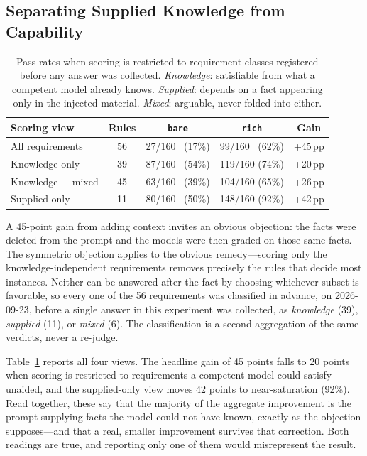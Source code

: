 \documentclass[conference]{IEEEtran}
\begin{document}
\subsection{Separating Supplied Knowledge from Capability}\label{sec:knowledge-split}

\begin{table}[t]
\centering
\caption{Pass rates when scoring is restricted to requirement classes registered before any answer was collected. \emph{Knowledge}: satisfiable from what a competent model already knows. \emph{Supplied}: depends on a fact appearing only in the injected material. \emph{Mixed}: arguable, never folded into either.}
\label{tab:knowledge-split}
\setlength{\tabcolsep}{5pt}
\begin{tabular}{lcccc}
\toprule
Scoring view & Rules & \texttt{bare} & \texttt{rich} & Gain \\
\midrule
All requirements   & 56 & 27/160 \ (17\%) & 99/160 \ (62\%) & +45\,pp \\
Knowledge only     & 39 & 87/160 \ (54\%) & 119/160 (74\%) & +20\,pp \\
Knowledge + mixed  & 45 & 63/160 \ (39\%) & 104/160 (65\%) & +26\,pp \\
Supplied only      & 11 & 80/160 \ (50\%) & 148/160 (92\%) & +42\,pp \\
\bottomrule
\end{tabular}
\end{table}

A 45-point gain from adding context invites an obvious objection: the facts were deleted from the prompt and the models were then graded on those same facts. The symmetric objection applies to the obvious remedy---scoring only the knowledge-independent requirements removes precisely the rules that decide most instances. Neither can be answered after the fact by choosing whichever subset is favorable, so every one of the 56 requirements was classified in advance, on 2026-09-23, before a single answer in this experiment was collected, as \emph{knowledge} (39), \emph{supplied} (11), or \emph{mixed} (6). The classification is a second aggregation of the same verdicts, never a re-judge.

Table~\ref{tab:knowledge-split} reports all four views. The headline gain of 45 points falls to 20 points when scoring is restricted to requirements a competent model could satisfy unaided, and the supplied-only view moves 42 points to near-saturation (92\%). Read together, these say that the majority of the aggregate improvement is the prompt supplying facts the model could not have known, exactly as the objection supposes---and that a real, smaller improvement survives that correction. Both readings are true, and reporting only one of them would misrepresent the result.
\end{document}
